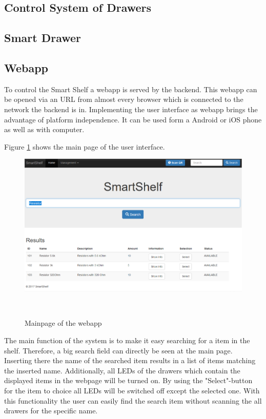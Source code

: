\subsection{Control System of Drawers}


\subsection{Smart Drawer}


\subsection{Webapp}
To control the Smart Shelf a webapp is served by the backend. 
This webapp can be opened via an URL from almost every browser which is connected to the network the backend is in. 
Implementing the user interface as webapp brings the advantage of platform independence. 
It can be used form a Android or iOS phone as well as with computer. 

Figure \ref{fig:webapp-mainpage} shows the main page of the user interface. 
%
\begin{figure}
	\centering
	\includegraphics[width=1.3\columnwidth]{figures/ui-mainpage.png}
	\caption{Mainpage of the webapp}~\label{fig:webapp-mainpage}
\end{figure}
%
The main function of the system is to make it easy searching for a item in the shelf. 
Therefore, a big search field can directly be seen at the main page. 
Inserting there the name of the searched item results in a list of items matching the inserted name. 
Additionally, all LEDs of the drawers which contain the displayed items in the webpage will be turned on. 
By using the "Select"-button for the item to choice all LEDs will be switched off except the selected one. 
With this functionality the user can easily find the search item without scanning the all drawers for the specific name. 

